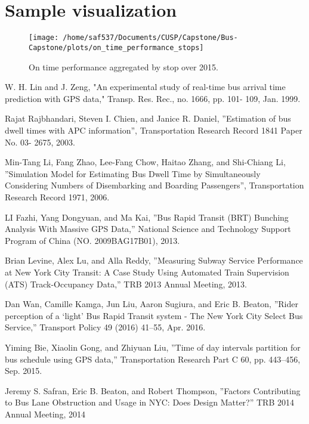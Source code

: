 \documentclass[12pt]{report}
\begin{document}
\newpage
\appendix
\section*{\\Sample visualization} \label{App:AppendixA}


\begin{figure}[!ht]
  \caption{On time performance aggregated by stop over 2015.}
  \centering
    \texttt{[image: /home/saf537/Documents/CUSP/Capstone/Bus-Capstone/plots/on\_time\_performance\_stops]}
\end{figure}

\begin{thebibliography}{14}

W. H. Lin and J. Zeng, "An experimental study of real-time bus arrival time prediction with GPS data," Transp. Res. Rec., no. 1666, pp. 101- 109, Jan. 1999.

Rajat Rajbhandari, Steven I. Chien, and Janice R. Daniel, ''Estimation of bus dwell times with APC information'', Transportation Research Record 1841 Paper No. 03- 2675, 2003.

Min-Tang Li, Fang Zhao, Lee-Fang Chow, Haitao Zhang, and Shi-Chiang Li, ''Simulation Model for Estimating Bus Dwell Time by Simultaneously Considering Numbers of Disembarking and Boarding Passengers'', Transportation Research Record 1971, 2006.

LI Fazhi, Yang Dongyuan, and Ma Kai, ''Bus Rapid Transit (BRT) Bunching Analysis With Massive GPS Data,'' National Science and Technology Support Program of China (NO. 2009BAG17B01), 2013.

Brian Levine, Alex Lu, and Alla Reddy, ''Measuring Subway Service Performance at New York City Transit: A Case Study Using Automated Train Supervision (ATS) Track-Occupancy Data,'' TRB 2013 Annual Meeting, 2013.

Dan Wan, Camille Kamga, Jun Liu, Aaron Sugiura, and Eric B. Beaton, ''Rider perception of a ‘light' Bus Rapid Transit system - The New York City Select Bus Service,'' Transport Policy 49 (2016) 41–55, Apr. 2016.


Yiming Bie, Xiaolin Gong, and Zhiyuan Liu, ''Time of day intervals partition for bus schedule using GPS data,'' Transportation Research Part C 60, pp. 443–456, Sep. 2015.

Jeremy S. Safran, Eric B. Beaton, and Robert Thompson, ''Factors Contributing to Bus Lane Obstruction and Usage in NYC: Does Design Matter?'' TRB 2014 Annual Meeting, 2014


\end{thebibliography}
\end{document}

